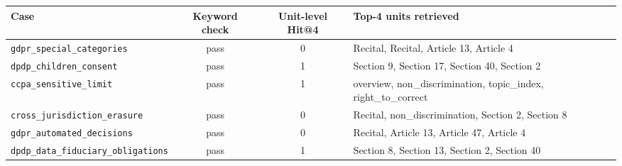 \begin{tabular}{@{}lccl@{}}
\toprule
Case & Keyword check & Unit-level Hit@4 & Top-4 units retrieved \\
\midrule
\texttt{gdpr\_special\_categories} & pass & 0 & Recital, Recital, Article 13, Article 4 \\
\texttt{dpdp\_children\_consent} & pass & 1 & Section 9, Section 17, Section 40, Section 2 \\
\texttt{ccpa\_sensitive\_limit} & pass & 1 & overview, non\_discrimination, topic\_index, right\_to\_correct \\
\texttt{cross\_jurisdiction\_erasure} & pass & 0 & Recital, non\_discrimination, Section 2, Section 8 \\
\texttt{gdpr\_automated\_decisions} & pass & 0 & Recital, Article 13, Article 47, Article 4 \\
\texttt{dpdp\_data\_fiduciary\_obligations} & pass & 1 & Section 8, Section 13, Section 2, Section 40 \\
\bottomrule
\end{tabular}